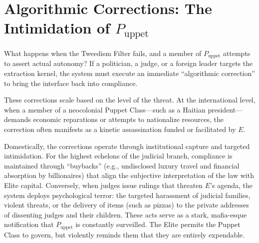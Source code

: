 \section{Algorithmic Corrections: The Intimidation of \texorpdfstring{$P_{\text{uppet}}$}{P\_uppet}}
\label{sec:legitimation_constraint}

What happens when the Tweedism Filter fails, and a member of $P_{\text{uppet}}$ attempts to assert actual autonomy? If a politician, a judge, or a foreign leader targets the extraction kernel, the system must execute an immediate ``algorithmic correction'' to bring the interface back into compliance.

These corrections scale based on the level of the threat. At the international level, when a member of a neocolonial Puppet Class---such as a Haitian president---demands economic reparations or attempts to nationalize resources, the correction often manifests as a kinetic assassination funded or facilitated by $E$.

Domestically, the corrections operate through institutional capture and targeted intimidation. For the highest echelons of the judicial branch, compliance is maintained through ``buybacks'' (e.g., undisclosed luxury travel and financial absorption by billionaires) that align the subjective interpretation of the law with Elite capital. Conversely, when judges issue rulings that threaten $E$'s agenda, the system deploys psychological terror: the targeted harassment of judicial families, violent threats, or the delivery of items (such as pizzas) to the private addresses of dissenting judges and their children. These acts serve as a stark, mafia-esque notification that $P_{\text{uppet}}$ is constantly surveilled. The Elite permits the Puppet Class to govern, but violently reminds them that they are entirely expendable.


